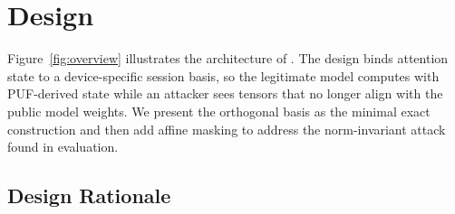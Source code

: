 \section{Design}
\label{sec:design}

Figure~\ref{fig:overview} illustrates the architecture of \sys{}. The design binds attention state to a device-specific session basis, so the legitimate model computes with PUF-derived state while an attacker sees tensors that no longer align with the public model weights. We present the orthogonal basis as the minimal exact construction and then add affine masking to address the norm-invariant attack found in evaluation.

\subsection{Design Rationale}

